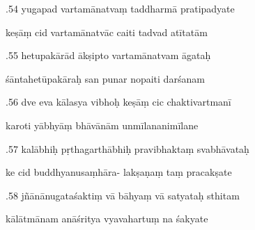 \documentclass[article,12pt,a4paper]{memoir}%
\newcounter{parCount}
\begin{document}
	  
	  \pstart {}.54 yugapad vartamānatvaṃ taddharmā pratipadyate 
	{}
	\pend%
      

	  
	  \pstart \leavevmode%
	keṣāṃ cid vartamānatvāc caiti tadvad atītatām 
	{}
	\pend%
      

	  
	  \pstart {}.55 hetupakārād ākṣipto vartamānatvam āgataḥ 
	{}
	\pend%
      

	  
	  \pstart \leavevmode%
	śāntahetūpakāraḥ san punar nopaiti darśanam 
	{}
	\pend%
      

	  
	  \pstart {}.56 dve eva kālasya vibhoḥ keṣāṃ cic chaktivartmanī 
	{}
	\pend%
      

	  
	  \pstart \leavevmode%
	karoti yābhyāṃ bhāvānām unmīlananimīlane 
	{}
	\pend%
      

	  
	  \pstart {}.57 kalābhiḥ pṛthagarthābhiḥ pravibhaktaṃ svabhāvataḥ 
	{}
	\pend%
      

	  
	  \pstart \leavevmode%
	ke cid buddhyanusaṃhāra- lakṣaṇaṃ taṃ pracakṣate 
	{}
	\pend%
      

	  
	  \pstart {}.58 jñānānugataśaktiṃ vā bāhyaṃ vā satyataḥ sthitam 
	{}
	\pend%
      

	  
	  \pstart \leavevmode%
	kālātmānam anāśritya vyavahartuṃ na śakyate 
	{}
	\pend%
      
\end{document}
